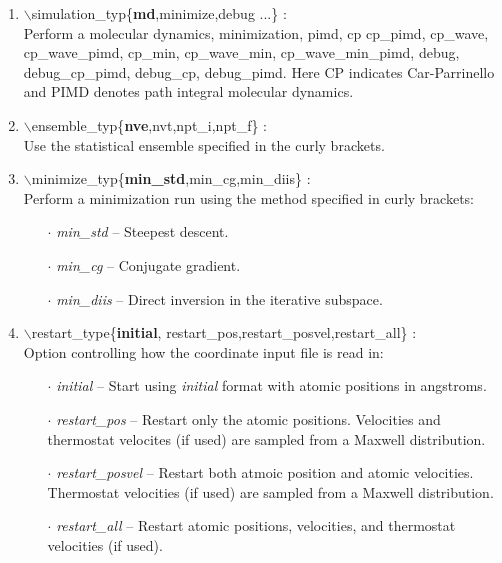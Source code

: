 \documentclass[12pt]{article}
\begin{document}
\begin{enumerate}
 \vspace{0.15in}
 \item $\backslash$simulation\_typ\{{\bf md},minimize,debug ...\} : \\
     Perform a molecular dynamics, minimization, pimd, cp
     cp\_pimd, cp\_wave, cp\_wave\_pimd, cp\_min, cp\_wave\_min,
     cp\_wave\_min\_pimd,
     debug, debug\_cp\_pimd, debug\_cp, debug\_pimd. Here CP indicates
     Car-Parrinello and PIMD  denotes path integral molecular dynamics.

 \vspace{0.15in} 
 \item  $\backslash$ensemble\_typ\{{\bf nve},nvt,npt\_i,npt\_f\} : \\
     Use the statistical ensemble specified in the curly brackets.

 \vspace{0.15in} 
 \item  $\backslash$minimize\_typ\{{\bf min\_std},min\_cg,min\_diis\} : \\
     Perform a minimization run using the method specified in curly brackets:
     \begin{itemize}
        \item[$\cdot$] {\it min\_std} -- Steepest descent.
        \item[$\cdot$] {\it min\_cg} -- Conjugate gradient.
        \item[$\cdot$] {\it min\_diis} -- Direct inversion in the 
                                          iterative subspace.
     \end{itemize}

 \vspace{0.15in} 
 \item  $\backslash$restart\_type\{{\bf initial},
             restart\_pos,restart\_posvel,restart\_all\} : \\
     Option controlling how the coordinate input file is read in:
     \begin{itemize}
       \item[$\cdot$] {\it initial} -- Start using {\it initial} format 
                                        with atomic positions in angstroms.
       \item[$\cdot$] {\it restart\_pos} -- Restart only the atomic positions.
                    Velocities and thermostat velocites (if used) are 
                    sampled from a Maxwell distribution.
       \item[$\cdot$] {\it restart\_posvel} -- Restart both atmoic position 
                     and atomic velocities.  Thermostat velocities (if used) 
                     are sampled from a Maxwell distribution.
       \item[$\cdot$] {\it restart\_all} -- Restart atomic positions, 
                     velocities, and thermostat velocities (if used).
     \end{itemize}


\end{enumerate}
\end{document}

